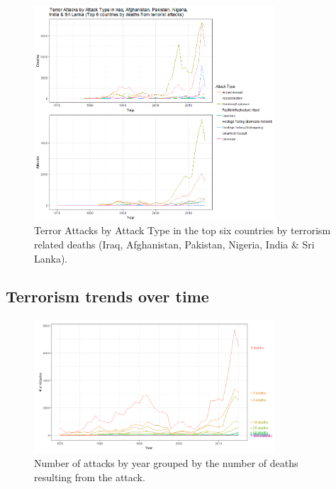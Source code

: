 \documentclass[10pt,a4paper]{article}
\begin{document}
\begin{center}
\begin{figure}[H]
	\includegraphics[width=0.8\textwidth]{Plots/AttackType/Top6.png}
	\caption{Terror Attacks by Attack Type in the top six countries by terrorism related deaths (Iraq, Afghanistan, Pakistan, Nigeria, India \& Sri Lanka).}
\end{figure}
\end{center}

\subsection{Terrorism trends over time}
\begin{center}
\begin{figure}[H]
		
	\includegraphics[width=0.8\textwidth]{Plots/OverTime/Attacks_over_time_grouped_by_deaths.png}
	\caption{Number of attacks by year grouped by the number of deaths resulting from the attack.}

\end{figure}
\end{center}
\end{document}
